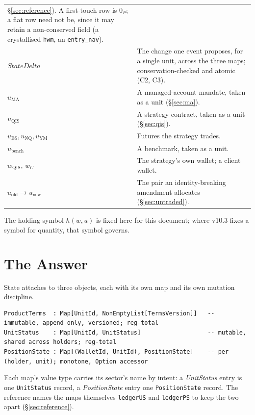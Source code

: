 \documentclass[11pt,a4paper]{article}
\begin{document}
\begin{longtable}{p{3.4cm}p{11.4cm}}
\S\ref{sec:reference}). A first-touch row is $0_P$; a flat row need not be, since it may
retain a non-conserved field (a crystallised \texttt{hwm}, an \texttt{entry\_nav}). \\
$\mathit{StateDelta}$ & The change one event proposes, for a single unit, across the three
maps; conservation-checked and atomic (C2, C3). \\
\addlinespace
$u_{\mathrm{MA}}$ & A managed-account mandate, taken as a unit (\S\ref{sec:ma}). \\
$u_{\mathrm{QIS}}$ & A strategy contract, taken as a unit (\S\ref{sec:qis}). \\
$u_{\mathrm{ES}},u_{\mathrm{NQ}},u_{\mathrm{YM}}$ & Futures the strategy trades. \\
$u_{\mathrm{bench}}$ & A benchmark, taken as a unit. \\
$w_{\mathrm{QIS}}$, $w_C$ & The strategy's own wallet; a client wallet. \\
$u_{\mathrm{old}}\!\to\!u_{\mathrm{new}}$ & The pair an identity-breaking amendment
allocates (\S\ref{sec:untraded}). \\
\bottomrule
\end{longtable}

\noindent The holding symbol $h(w,u)$ is fixed here for this document; where v10.3 fixes a
symbol for quantity, that symbol governs.

\section{The Answer}
\label{sec:answer}

State attaches to three objects, each with its own map and its own mutation discipline.

\begin{lstlisting}[language={},basicstyle=\ttfamily\footnotesize]
ProductTerms  : Map[UnitId, NonEmptyList[TermsVersion]]   -- immutable, append-only, versioned; reg-total
UnitStatus    : Map[UnitId, UnitStatus]                   -- mutable, shared across holders; reg-total
PositionState : Map[(WalletId, UnitId), PositionState]    -- per (holder, unit); monotone, Option accessor
\end{lstlisting}

\noindent Each map's value type carries its sector's name by intent: a \emph{UnitStatus}
entry is one \texttt{UnitStatus} record, a \emph{PositionState} entry one
\texttt{PositionState} record. The reference names the maps themselves \texttt{ledgerUS} and
\texttt{ledgerPS} to keep the two apart (\S\ref{sec:reference}).
\end{document}
